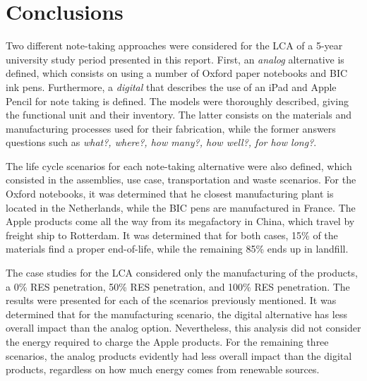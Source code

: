 \section{Conclusions}\label{sec:conclusions}

Two different note-taking approaches were considered for the LCA of a 5-year university study period presented in this report. First, an \textit{analog} alternative is defined, which consists on using a number of Oxford paper notebooks and BIC ink pens. Furthermore, a \textit{digital} that describes the use of an iPad and Apple Pencil for note taking is defined. The models were thoroughly described, giving the functional unit and their inventory. The latter consists on the materials and manufacturing processes used for their fabrication, while the former answers questions such as \textit{what?, where?, how many?, how well?, for how long?}. 

The life cycle scenarios for each note-taking alternative were also defined, which consisted in the assemblies, use case, transportation and waste scenarios. For the Oxford notebooks, it was determined that he closest manufacturing plant is located in the Netherlands, while the BIC pens are manufactured in France. The Apple products come all the way from its megafactory in China, which travel by freight ship to Rotterdam. It was determined that for both cases, 15\% of the materials find a proper end-of-life, while the remaining 85\% ends up in landfill. 

The case studies for the LCA considered only the manufacturing of the products, a 0\% RES penetration, 50\% RES penetration, and 100\% RES penetration. The results were presented for each of the scenarios previously mentioned. It was determined that for the manufacturing scenario, the digital alternative has less overall impact than the analog option. Nevertheless, this analysis did not consider the energy required to charge the Apple products. For the remaining three scenarios, the analog products evidently had less overall impact than the digital products, regardless on how much energy comes from renewable sources. 